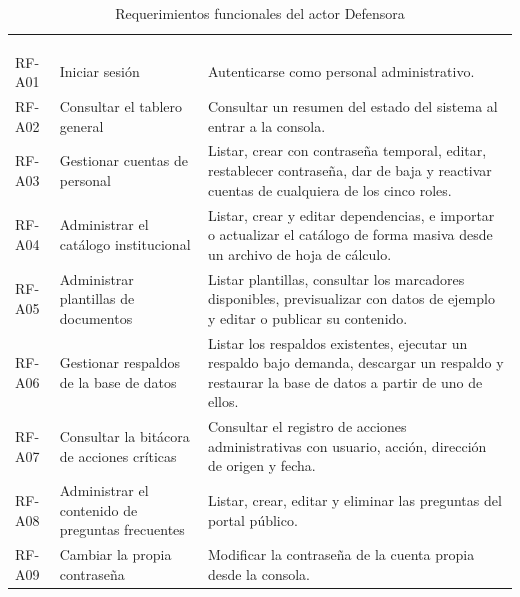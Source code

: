 	\begin{longtable}{|L{1.7cm}|L{4.0cm}|L{9.9cm}|}
		\hiderowcolors\caption{Requerimientos funcionales del actor Defensora}
		\label{tab:rf_admin} \\ \showrowcolors
		\hline
		 &  &  \\
		\hline
		\endfirsthead
	
		\hline
		 &  &  \\
		\hline
		\endhead
	
		RF-A01 & Iniciar sesión & Autenticarse como personal administrativo. \\ \hline
	
		RF-A02 & Consultar el tablero general & Consultar un resumen del estado del sistema al
		entrar a la consola. \\ \hline
	
		RF-A03 & Gestionar cuentas de personal & Listar, crear con contraseña temporal, editar,
		restablecer contraseña, dar de baja y reactivar cuentas de cualquiera de los cinco roles.
		\\ \hline
	
		RF-A04 & Administrar el catálogo institucional & Listar, crear y editar dependencias, e
		importar o actualizar el catálogo de forma masiva desde un archivo de hoja de cálculo.
		\\ \hline
	
		RF-A05 & Administrar plantillas de documentos & Listar plantillas, consultar los marcadores
		disponibles, previsualizar con datos de ejemplo y editar o publicar su contenido. \\ \hline
	
		RF-A06 & Gestionar respaldos de la base de datos & Listar los respaldos existentes, ejecutar
		un respaldo bajo demanda, descargar un respaldo y restaurar la base de datos a partir de uno
		de ellos. \\ \hline
	
		RF-A07 & Consultar la bitácora de acciones críticas & Consultar el registro de acciones
		administrativas con usuario, acción, dirección de origen y fecha. \\ \hline
	
		RF-A08 & Administrar el contenido de preguntas frecuentes & Listar, crear, editar y eliminar
		las preguntas del portal público. \\ \hline
	
		RF-A09 & Cambiar la propia contraseña & Modificar la contraseña de la cuenta propia desde la
		consola. \\ \hline
	\end{longtable}
	
